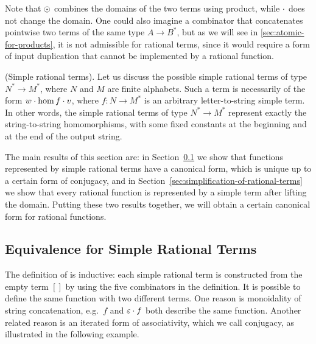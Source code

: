 
Note that $\odot$ combines the domains of the two terms using product, while $\cdot$ does not change the domain. One could also imagine a combinator that concatenates pointwise two terms of the same type $A \to B^*$, but as we will see in \cref{sec:atomic-for-products}, it is not admissible for rational terms, since it would require a form of input duplication that cannot be implemented by a rational function.

\begin{myexample}(Simple rational terms).
Let us discuss the possible simple rational terms of type $N^* \to M^*$, where $N$ and $M$ are finite alphabets. Such a term is necessarily of the form $w \cdot \hom f \cdot v$, where $f : N \to M^*$ is an arbitrary letter-to-string simple term. In other words, the simple rational terms of type $N^* \to M^*$ represent exactly the string-to-string homomorphisms, with some fixed constants at the beginning and at the end of the output string.
\end{myexample}

The main results of this section are: in Section~\ref{sec:canonical-form-for-simple-rational-terms} we show that functions represented by simple rational terms have a canonical form, which is unique up to a certain form of conjugacy, and in Section~\ref{sec:simplification-of-rational-terms} we show that every rational function is represented by a simple term after lifting the domain. Putting these two results together, we will obtain a certain canonical form for rational functions.
\subsection{Equivalence for Simple Rational Terms}
\label{sec:canonical-form-for-simple-rational-terms}



The definition of  is inductive: each simple rational term is constructed from the empty term $[]$ by using the five combinators in the definition. It is possible to define the same function with two different terms. One reason is monoidality of string concatenation, e.g.~$f$ and $\varepsilon \cdot f$  both describe the same function. Another related reason is an iterated form of associativity, which we call conjugacy, as illustrated in the following example.


